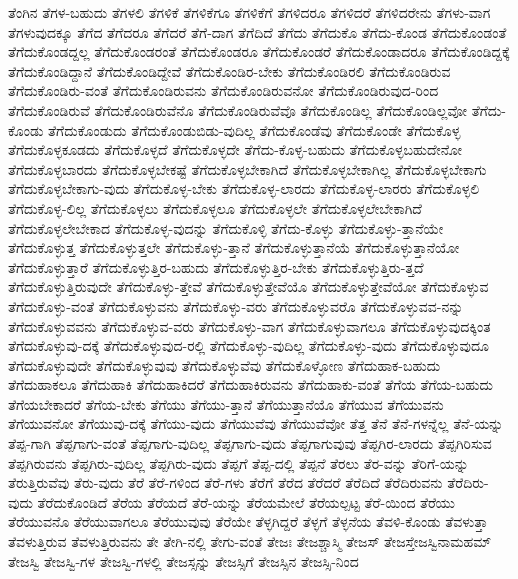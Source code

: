 {ತೆಂಗಿನ
ತೆಗಳ-ಬಹುದು
ತೆಗಳಲಿ
ತೆಗಳಿಕೆ
ತೆಗಳಿಕೆಗೂ
ತೆಗಳಿಕೆಗೆ
ತೆಗಳಿದರೂ
ತೆಗಳಿದರೆ
ತೆಗಳಿದರೇನು
ತೆಗಳು-ವಾಗ
ತೆಗಳುವುದಕ್ಕೂ
ತೆಗೆದ
ತೆಗೆದರೂ
ತೆಗೆದರೆ
ತೆಗೆ-ದಾಗ
ತೆಗೆದಿದೆ
ತೆಗೆದು
ತೆಗೆದುಕೊ
ತೆಗೆದು-ಕೊಂಡ
ತೆಗೆದುಕೊಂಡಂತೆ
ತೆಗೆದುಕೊಂಡದ್ದಲ್ಲ
ತೆಗೆದುಕೊಂಡರಂತೆ
ತೆಗೆದುಕೊಂಡರೂ
ತೆಗೆದುಕೊಂಡರೆ
ತೆಗೆದುಕೊಂಡಾದರೂ
ತೆಗೆದುಕೊಂಡಿದ್ದಕ್ಕೆ
ತೆಗೆದುಕೊಂಡಿದ್ದಾನೆ
ತೆಗೆದುಕೊಂಡಿದ್ದೇವೆ
ತೆಗೆದುಕೊಂಡಿರ-ಬೇಕು
ತೆಗೆದುಕೊಂಡಿರಲಿ
ತೆಗೆದುಕೊಂಡಿರುವ
ತೆಗೆದುಕೊಂಡಿರು-ವಂತೆ
ತೆಗೆದುಕೊಂಡಿರುವನು
ತೆಗೆದುಕೊಂಡಿರುವನೋ
ತೆಗೆದುಕೊಂಡಿರುವುದ-ರಿಂದ
ತೆಗೆದುಕೊಂಡಿರುವೆ
ತೆಗೆದುಕೊಂಡಿರುವೆನೊ
ತೆಗೆದುಕೊಂಡಿರುವೆವೊ
ತೆಗೆದುಕೊಂಡಿಲ್ಲ
ತೆಗೆದುಕೊಂಡಿಲ್ಲವೋ
ತೆಗೆದು-ಕೊಂಡು
ತೆಗೆದುಕೊಂಡುದು
ತೆಗೆದುಕೊಂಡುಬಿಡು-ವುದಿಲ್ಲ
ತೆಗೆದುಕೊಂಡೆವು
ತೆಗೆದುಕೊಂಡೇ
ತೆಗೆದುಕೊಳ್ಳ
ತೆಗೆದುಕೊಳ್ಳಕೂಡದು
ತೆಗೆದುಕೊಳ್ಳದೆ
ತೆಗೆದುಕೊಳ್ಳದೇ
ತೆಗೆದು-ಕೊಳ್ಳ-ಬಹುದು
ತೆಗೆದುಕೊಳ್ಳಬಹುದೇನೋ
ತೆಗೆದುಕೊಳ್ಳಬಾರದು
ತೆಗೆದುಕೊಳ್ಳಬೇಕಷ್ಟೆ
ತೆಗೆದುಕೊಳ್ಳಬೇಕಾಗಿದೆ
ತೆಗೆದುಕೊಳ್ಳಬೇಕಾಗಿಲ್ಲ
ತೆಗೆದುಕೊಳ್ಳಬೇಕಾಗು
ತೆಗೆದುಕೊಳ್ಳಬೇಕಾಗು-ವುದು
ತೆಗೆದುಕೊಳ್ಳ-ಬೇಕು
ತೆಗೆದುಕೊಳ್ಳ-ಲಾರದು
ತೆಗೆದುಕೊಳ್ಳ-ಲಾರರು
ತೆಗೆದುಕೊಳ್ಳಲಿ
ತೆಗೆದುಕೊಳ್ಳ-ಲಿಲ್ಲ
ತೆಗೆದುಕೊಳ್ಳಲು
ತೆಗೆದುಕೊಳ್ಳಲೂ
ತೆಗೆದುಕೊಳ್ಳಲೇ
ತೆಗೆದುಕೊಳ್ಳಲೇಬೇಕಾಗಿದೆ
ತೆಗೆದುಕೊಳ್ಳಲೇಬೇಕಾದ
ತೆಗೆದುಕೊಳ್ಳ-ವುದನ್ನು
ತೆಗೆದುಕೊಳ್ಳಿ
ತೆಗೆದು-ಕೊಳ್ಳು
ತೆಗೆದುಕೊಳ್ಳು-ತ್ತಾನೆಯೇ
ತೆಗೆದುಕೊಳ್ಳುತ್ತ
ತೆಗೆದುಕೊಳ್ಳುತ್ತಲೇ
ತೆಗೆದುಕೊಳ್ಳು-ತ್ತಾನೆ
ತೆಗೆದುಕೊಳ್ಳುತ್ತಾನೆಯೆ
ತೆಗೆದುಕೊಳ್ಳುತ್ತಾನೆಯೋ
ತೆಗೆದುಕೊಳ್ಳುತ್ತಾರೆ
ತೆಗೆದುಕೊಳ್ಳುತ್ತಿರ-ಬಹುದು
ತೆಗೆದುಕೊಳ್ಳುತ್ತಿರ-ಬೇಕು
ತೆಗೆದುಕೊಳ್ಳುತ್ತಿರು-ತ್ತದೆ
ತೆಗೆದುಕೊಳ್ಳುತ್ತಿರುವುದೇ
ತೆಗೆದುಕೊಳ್ಳು-ತ್ತೇವೆ
ತೆಗೆದುಕೊಳ್ಳುತ್ತೇವೆಯೊ
ತೆಗೆದುಕೊಳ್ಳುತ್ತೇವೆಯೋ
ತೆಗೆದುಕೊಳ್ಳುವ
ತೆಗೆದುಕೊಳ್ಳು-ವಂತೆ
ತೆಗೆದುಕೊಳ್ಳುವನು
ತೆಗೆದುಕೊಳ್ಳು-ವರು
ತೆಗೆದುಕೊಳ್ಳುವರೊ
ತೆಗೆದುಕೊಳ್ಳುವವ-ನನ್ನು
ತೆಗೆದುಕೊಳ್ಳುವವನು
ತೆಗೆದುಕೊಳ್ಳುವ-ವರು
ತೆಗೆದುಕೊಳ್ಳು-ವಾಗ
ತೆಗೆದುಕೊಳ್ಳುವಾಗಲೂ
ತೆಗೆದುಕೊಳ್ಳುವುದಕ್ಕಿಂತ
ತೆಗೆದುಕೊಳ್ಳುವು-ದಕ್ಕೆ
ತೆಗೆದುಕೊಳ್ಳುವುದ-ರಲ್ಲಿ
ತೆಗೆದುಕೊಳ್ಳು-ವುದಿಲ್ಲ
ತೆಗೆದುಕೊಳ್ಳು-ವುದು
ತೆಗೆದುಕೊಳ್ಳುವುದೂ
ತೆಗೆದುಕೊಳ್ಳುವುದೇ
ತೆಗೆದುಕೊಳ್ಳುವುವು
ತೆಗೆದುಕೊಳ್ಳುವೆವು
ತೆಗೆದುಕೊಳ್ಳೋಣ
ತೆಗೆದುಹಾಕ-ಬಹುದು
ತೆಗೆದುಹಾಕಲೂ
ತೆಗೆದುಹಾಕಿ
ತೆಗೆದುಹಾಕಿದರೆ
ತೆಗೆದುಹಾಕಿರುವನು
ತೆಗೆದುಹಾಕು-ವಂತೆ
ತೆಗೆಯ
ತೆಗೆಯ-ಬಹುದು
ತೆಗೆಯಬೇಕಾದರೆ
ತೆಗೆಯ-ಬೇಕು
ತೆಗೆಯು
ತೆಗೆಯು-ತ್ತಾನೆ
ತೆಗೆಯುತ್ತಾನೆಯೊ
ತೆಗೆಯುವ
ತೆಗೆಯುವನು
ತೆಗೆಯುವನೋ
ತೆಗೆಯುವು-ದಕ್ಕೆ
ತೆಗೆಯು-ವುದು
ತೆಗೆಯುವೆವು
ತೆಗೆಯುವೆವೋ
ತೆತ್ತ
ತೆನೆ
ತೆನೆ-ಗಳನ್ನೆಲ್ಲ
ತೆನೆ-ಯನ್ನು
ತೆಪ್ಪ-ಗಾಗಿ
ತೆಪ್ಪಗಾಗು-ವಂತೆ
ತೆಪ್ಪಗಾಗು-ವುದಿಲ್ಲ
ತೆಪ್ಪಗಾಗು-ವುದು
ತೆಪ್ಪಗಾಗುವುವು
ತೆಪ್ಪಗಿರ-ಲಾರದು
ತೆಪ್ಪಗಿರಿಸುವ
ತೆಪ್ಪಗಿರುವನು
ತೆಪ್ಪಗಿರು-ವುದಿಲ್ಲ
ತೆಪ್ಪಗಿರು-ವುದು
ತೆಪ್ಪಗೆ
ತೆಪ್ಪ-ದಲ್ಲಿ
ತೆಪ್ಪನೆ
ತೆರಲು
ತೆರ-ವನ್ನು
ತೆರಿಗೆ-ಯನ್ನು
ತೆರುತ್ತಿರುವೆವು
ತೆರು-ವುದು
ತೆರೆ
ತೆರೆ-ಗಳಿಂದ
ತೆರೆ-ಗಳು
ತೆರೆಗೆ
ತೆರೆದ
ತೆರೆದರೆ
ತೆರೆದಿದೆ
ತೆರೆದಿರುವನು
ತೆರೆದಿರು-ವುದು
ತೆರೆದುಕೊಂಡಿದೆ
ತೆರೆಯ
ತೆರೆಯದೆ
ತೆರೆ-ಯನ್ನು
ತೆರೆಯಮೇಲೆ
ತೆರೆಯಲ್ಪಟ್ಟ
ತೆರೆ-ಯಿಂದ
ತೆರೆಯು
ತೆರೆಯುವನೊ
ತೆರೆಯುವಾಗಲೂ
ತೆರೆಯುವುವು
ತೆರೆಯೇ
ತೆಳ್ಳಗಿದ್ದರೆ
ತೆಳ್ಳಗೆ
ತೆಳ್ಳನೆಯ
ತೆವಳಿ-ಕೊಂಡು
ತೆವಳುತ್ತಾ
ತೆವಳುತ್ತಿರುವ
ತೆವಳುತ್ತಿರುವನು
ತೇ
ತೇಗಿ-ನಲ್ಲಿ
ತೇಗು-ವಂತೆ
ತೇಜಃ
ತೇಜಶ್ಚಾಸ್ಮಿ
ತೇಜಸ್
ತೇಜಸ್ತೇಜಸ್ವಿನಾಮಹಮ್
ತೇಜಸ್ವಿ
ತೇಜಸ್ವಿ-ಗಳ
ತೇಜಸ್ವಿ-ಗಳಲ್ಲಿ
ತೇಜಸ್ಸನ್ನು
ತೇಜಸ್ಸಿಗೆ
ತೇಜಸ್ಸಿನ
ತೇಜಸ್ಸಿ-ನಿಂದ
}
